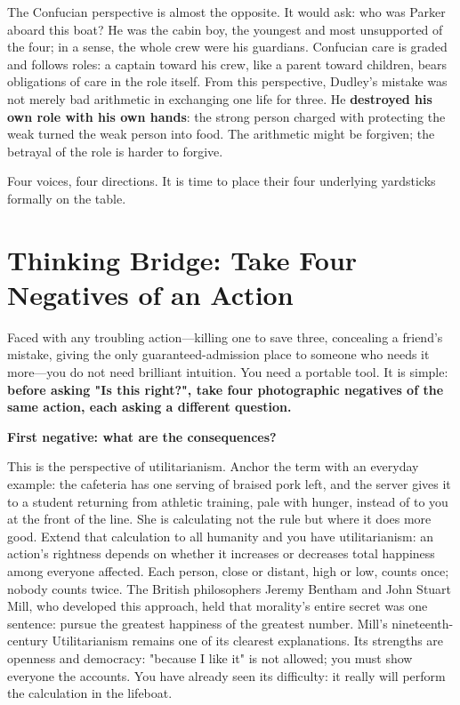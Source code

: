 The Confucian perspective is almost the opposite. It would ask: who was Parker aboard this boat? He was the cabin boy, the youngest and most unsupported of the four; in a sense, the whole crew were his guardians. Confucian care is graded and follows roles: a captain toward his crew, like a parent toward children, bears obligations of care in the role itself. From this perspective, Dudley's mistake was not merely bad arithmetic in exchanging one life for three. He \textbf{destroyed his own role with his own hands}: the strong person charged with protecting the weak turned the weak person into food. The arithmetic might be forgiven; the betrayal of the role is harder to forgive.

Four voices, four directions. It is time to place their four underlying yardsticks formally on the table.

\section[Thinking Tool: Four Negatives]{Thinking Bridge: Take Four Negatives of an Action}
Faced with any troubling action---killing one to save three, concealing a friend's mistake, giving the only guaranteed-admission place to someone who needs it more---you do not need brilliant intuition. You need a portable tool. It is simple: \textbf{before asking "Is this right?", take four photographic negatives of the same action, each asking a different question.}

\textbf{First negative: what are the consequences?}

This is the perspective of utilitarianism. Anchor the term with an everyday example: the cafeteria has one serving of braised pork left, and the server gives it to a student returning from athletic training, pale with hunger, instead of to you at the front of the line. She is calculating not the rule but where it does more good. Extend that calculation to all humanity and you have utilitarianism: an action's rightness depends on whether it increases or decreases total happiness among everyone affected. Each person, close or distant, high or low, counts once; nobody counts twice. The British philosophers Jeremy Bentham and John Stuart Mill, who developed this approach, held that morality's entire secret was one sentence: pursue the greatest happiness of the greatest number. Mill's nineteenth-century Utilitarianism remains one of its clearest explanations. Its strengths are openness and democracy: "because I like it" is not allowed; you must show everyone the accounts. You have already seen its difficulty: it really will perform the calculation in the lifeboat.

